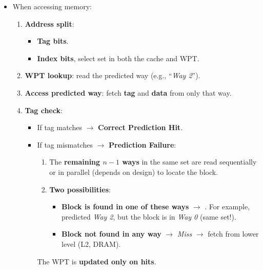 \begin{itemize}
\begin{itemize}
        \item When accessing memory:
        \begin{enumerate}
            \item \textbf{Address split}:
            \begin{itemize}
                \item \textbf{Tag bits}.
                \item \textbf{Index bits}, select set in both the cache and WPT.
            \end{itemize}
            \item \textbf{WPT lookup}: read the predicted way (e.g., ``\emph{Way 2}'').
            \item \textbf{Access predicted way}: fetch \textbf{tag} and \textbf{data} from only that way.
            \item \textbf{Tag check}:
            \begin{itemize}
                \item[\textcolor{Green3}{\faIcon{check}}] If tag matches $\rightarrow$ \textcolor{Green3}{} \textbf{Correct Prediction Hit}.
                \item[\textcolor{Red2}{\faIcon{times}}] If tag mismatches $\rightarrow$ \textcolor{Red2}{} \textbf{Prediction Failure}:
                \begin{enumerate}
                    \item The \textbf{remaining $n-1$ ways} in the same set are read sequentially or in parallel (depends on design) to locate the block.
                    \item \textbf{Two possibilities}:
                    \begin{itemize}
                        \item \textbf{Block is found in one of these ways} $\rightarrow$ . For example, predicted \emph{Way 2}, but the block is in \emph{Way 0} (same set!).
                        \item \textbf{Block not found in any way} $\rightarrow$ \emph{Miss} $\rightarrow$ fetch from lower level (L2, DRAM).
                    \end{itemize}
                \end{enumerate}
                The WPT is \textbf{updated only on hits}.
            \end{itemize}
        \end{enumerate}
        \begin{examplebox}

\end{examplebox}
\end{itemize}
\end{itemize}
